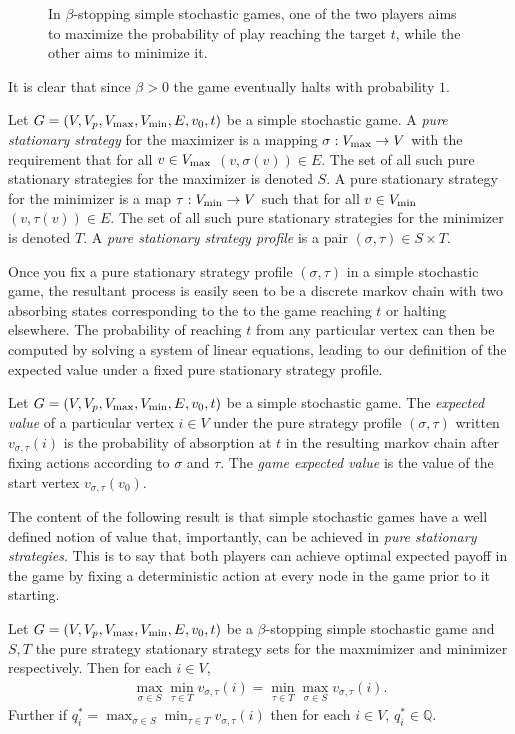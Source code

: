 \begin{figure}[h]
  \centering
  
  \caption{In $\beta$-stopping simple stochastic games, one of the two players aims to maximize the probability
  of play reaching the target $t$, while the other aims to minimize it.}
\end{figure}
It is clear that since $\beta > 0$ the game eventually halts with probability $1$. 
\begin{definition}
  Let $G = (V, V_p, V_{\max}, V_{\min}, E, v_0, t)$ be a simple stochastic game. A \emph{pure stationary strategy}
  for the maximizer is a mapping $\sigma : V_{\max} \to V$ with the requirement that for all $v \in V_{\max}$
  $(v, \sigma(v)) \in E$. The set of all such pure stationary strategies for the maximizer is denoted
  $S$. A pure stationary strategy for the minimizer is a map $\tau : V_{\min} \to V$ such that
  for all $v \in V_{\min}$ 
  $(v, \tau(v)) \in E$. The set of all such pure stationary strategies for the minimizer is denoted $T$. 
  A \emph{pure stationary strategy profile} is a pair $(\sigma, \tau) \in S \times T$.
\end{definition}
Once you fix a pure stationary strategy profile $(\sigma, \tau)$
in a simple stochastic game, the resultant process is easily seen
to be a discrete markov chain with two absorbing states corresponding to
the to the game reaching $t$ or halting elsewhere. The probability
of reaching $t$ from any particular vertex can then be computed 
by solving a system of linear equations, leading to our definition of the expected value under 
a fixed pure stationary strategy profile.
\begin{definition}
  Let $G = (V, V_p, V_{\max}, V_{\min}, E, v_0, t)$ be a simple stochastic game.
  The \emph{expected value} of
  a particular vertex $i \in V$ under the pure strategy profile 
  $(\sigma, \tau)$ written $v_{\sigma, \tau}(i)$ is the probability
  of absorption at $t$ in the resulting markov chain after fixing actions
  according to $\sigma$ and $\tau$.
  The \emph{game expected value} is the value of the start vertex $v_{\sigma, \tau}(v_0)$.
\end{definition}
The content of the following result is that simple stochastic games have a well defined
notion of value that, importantly, can be achieved in \emph{pure stationary strategies}.
This is to say that both players can achieve optimal expected payoff in the game
by fixing a deterministic action at every node in the game prior to it starting.
\begin{theorem} \label{ssgHasValue}
  Let $G = (V, V_p, V_{\max}, V_{\min}, E, v_0, t)$ be a $\beta$-stopping simple 
  stochastic game and $S, T$ the pure strategy stationary strategy sets
  for the maxmimizer and minimizer respectively.
  Then for each $i \in V$,
  \begin{align*}
    \max_{\sigma \in S} \min_{\tau \in T} v_{\sigma, \tau} (i) = 
  \min_{\tau \in T} \max_{\sigma \in S} v_{\sigma, \tau} (i).
  \end{align*}
  Further if $q_i^* = \max_{\sigma \in S} \min_{\tau \in T} v_{\sigma, \tau} (i)$
  then for each $i \in V$, $q_i^* \in \mathbb{Q}$.
\end{theorem}
